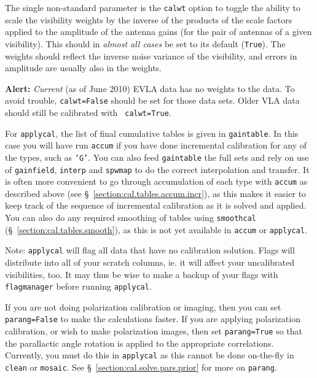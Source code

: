 The single non-standard parameter is the {\tt calwt} option to toggle
the ability to scale the visibility weights by the inverse of the 
products of the scale factors applied to the amplitude of the antenna
gains (for the pair of antennas of a given visibility).  
This should in {\em almost all cases} be set to its default ({\tt True}).
The weights should reflect the inverse noise variance of the
visibility, and errors in amplitude are usually also in the weights.


{\bf Alert:} {\it Current} (as of June 2010) EVLA data has no weights
to the data. To avoid trouble, {\tt calwt=False} should be set for
those data sets. Older VLA data should still be calibrated with {\tt
  calwt=True}.

For {\tt applycal}, the list of final cumulative tables is given in 
{\tt gaintable}.  In this case you will have run {\tt accum} if you
have done incremental calibration for any of the types, such as {\tt 'G'}. 
You can also feed {\tt gaintable} the full sets and rely on use of
{\tt gainfield}, {\tt interp} and {\tt spwmap} to do the correct 
interpolation and transfer.  It is often more convenient to go through
accumulation of each type with {\tt accum} as described above
(see \S~\ref{section:cal.tables.accum.incr}), as this makes it easier
to keep track of the sequence of incremental calibration as it is
solved and applied.  You can also do any required smoothing of tables
using {\tt smoothcal} (\S~\ref{section:cal.tables.smooth}), as this
is not yet available in {\tt accum} or {\tt applycal}.

Note: {\tt applycal} will flag all data that have no calibration
solution. Flags will distribute into all of your scratch columns,
ie. it will affect your uncalibrated visibilities, too. It may thus be
wise to make a backup of your flags with {\tt flagmanager} before
running {\tt applycal}.


If you are not doing polarization calibration or imaging, then you can set 
{\tt parang=False} to make the calculations faster.  If you are
applying polarization calibration, or wish to make polarization
images, then set {\tt parang=True} so that the parallactic angle
rotation is applied to the appropriate correlations.  Currently,
you must do this in {\tt applycal} as this cannot be done on-the-fly
in {\tt clean} or {\tt mosaic}.  
See \S~\ref{section:cal.solve.pars.prior} for more on {\tt parang}.


